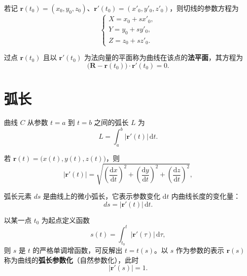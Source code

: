 若记 $\boldsymbol{r}(t_0)=(x_0,y_0,z_0)$、$\boldsymbol{r}'(t_0)=(x'_0,y'_0,z'_0)$，则切线的参数方程为
\begin{equation}
	\begin{cases}
		X=x_0+s x'_0,\\
		Y=y_0+s y'_0,\\
		Z=z_0+s z'_0.
	\end{cases}
	\label{eq:切线:分量方程}
\end{equation}

\begin{definition}[法平面]
	过点 $\boldsymbol{r}(t_0)$ 且以 $\boldsymbol{r}'(t_0)$ 为法向量的平面称为曲线在该点的\textbf{法平面}，其方程为
	\begin{equation}
		\bigl(\boldsymbol{R}-\boldsymbol{r}(t_0)\bigr)\cdot\boldsymbol{r}'(t_0)=0.
		\label{eq:法平面:方程}
	\end{equation}
\end{definition}

\section{弧长}

\begin{theorem}[弧长公式]
	曲线 $C$ 从参数 $t=a$ 到 $t=b$ 之间的弧长 $L$ 为
	\begin{equation}
		L=\int_{a}^{b}\left|\boldsymbol{r}'(t)\right|\,\mathrm{d}t.
		\label{eq:弧长:公式}
	\end{equation}
\end{theorem}

若 $\boldsymbol{r}(t)=\bigl(x(t),y(t),z(t)\bigr)$，则
\begin{equation}
	\left|\boldsymbol{r}'(t)\right|
	=\sqrt{\left(\frac{\mathrm{d}x}{\mathrm{d}t}\right)^{2}
	+\left(\frac{\mathrm{d}y}{\mathrm{d}t}\right)^{2}
	+\left(\frac{\mathrm{d}z}{\mathrm{d}t}\right)^{2}},
	\label{eq:弧长:切向量模}
\end{equation}

弧长元素 $ds$ 是曲线上的微小弧长，它表示参数变化 $\mathrm{d}t$ 内曲线长度的变化量：
\begin{equation}
	ds=\left|\boldsymbol{r}'(t)\right|\,\mathrm{d}t.
	\label{eq:弧长元素:定义}
\end{equation}

\begin{definition}[弧长参数]
	以某一点 $t_0$ 为起点定义函数
	\begin{equation}
		s(t)=\int_{t_0}^{t}\left|\boldsymbol{r}'(\tau)\right|\,\mathrm{d}\tau,
		\label{eq:弧长参数:定义}
	\end{equation}
	则 $s$ 是 $t$ 的严格单调增函数，可反解出 $t=t(s)$。以 $s$ 作为参数的表示 $\boldsymbol{r}(s)$ 称为曲线的\textbf{弧长参数化}（自然参数化），此时
	\begin{equation}
		\left|\boldsymbol{r}'(s)\right|=1.
		\label{eq:弧长参数:单位切向量}
	\end{equation}
\end{definition}

